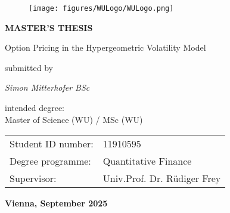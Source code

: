 \documentclass[a4paper,11pt]{article}
\begin{document}

\thispagestyle{empty}
\begin{figure}[h!]
    \raggedleft
    \texttt{[image: figures/WULogo/WULogo.png]}
\end{figure}


\begin{center}
    \textbf{\huge MASTER’S THESIS} \\
    \vspace{1.5cm}

    \LARGE Option Pricing in the Hypergeometric Volatility Model \\
    \vspace{2.5cm}
    
    \normalsize submitted by \\
    \vspace{0.5cm}
    
    \textit{\Large Simon Mitterhofer BSc}
    \vspace{2cm}
    
    intended degree: \\
    \Large Master of Science (WU) / MSc (WU)
        \\
\vspace{1cm}
\normalsize

    \begin{tabular}{ll}
        Student ID number: & 11910595 \\
        Degree programme: & Quantitative Finance \\
        Supervisor: & Univ.Prof. Dr. Rüdiger Frey \\
    \end{tabular}
    \vspace{2cm}
    
    \textbf{Vienna, September 2025}
\end{center}

\newpage




\tableofcontents








\appendix



\end{document}
